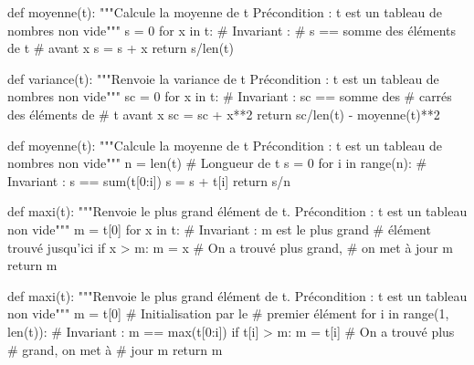 \begin{multicols}{2}
\begin{pyverbatim}
def moyenne(t):
    """Calcule la moyenne de t
       Précondition : t est un tableau de 
       nombres non vide"""
    s = 0 
    for x in t:
        # Invariant : 
        # s == somme des éléments de t 
        # avant x
        s = s + x 
    return s/len(t)
\end{pyverbatim}

\begin{pyverbatim}
def variance(t):
    """Renvoie la variance de t
       Précondition : t est un tableau de 
       nombres non vide"""
    sc = 0
    for x in t:
        # Invariant : sc == somme des 
        # carrés des éléments de 
        # t avant x
        sc = sc + x**2 
    return sc/len(t) - moyenne(t)**2
\end{pyverbatim}


\begin{pyverbatim}
def moyenne(t):
    """Calcule la moyenne de t
       Précondition : t est un tableau de 
       nombres non vide"""
    n = len(t) # Longueur de t
    s = 0 
    for i in range(n):
        # Invariant : s == sum(t[0:i])
        s = s + t[i]
    return s/n 
\end{pyverbatim}



\begin{pyverbatim}
def maxi(t):
    """Renvoie le plus grand élément de t.
       Précondition : t est un tableau 
       non vide"""
    m = t[0]
    for x in t:
        # Invariant : m est le plus grand 
        # élément trouvé jusqu'ici
        if x > m:
            m = x # On a trouvé plus grand, 
                  # on met à jour m
    return m
\end{pyverbatim}


\begin{pyverbatim}
def maxi(t):
    """Renvoie le plus grand élément de t.
       Précondition : t est un tableau 
       non vide"""
    m = t[0] # Initialisation par le 
             # premier élément
    for i in range(1, len(t)):
        # Invariant : m == max(t[0:i])
        if t[i] > m:
            m = t[i] # On a trouvé plus
                     # grand, on met à 
                     # jour m
    return m
\end{pyverbatim}

\vfill\null
\columnbreak


\end{multicols}
